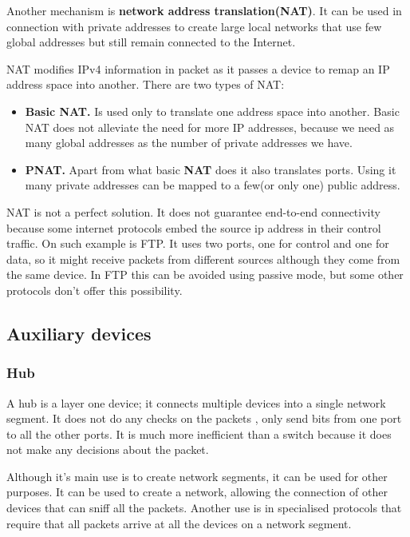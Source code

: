 Another mechanism is \textbf{network address translation(NAT)}. It can be used in connection with private addresses to create
large local networks that use few global addresses but still remain connected to the Internet. 

NAT modifies IPv4 information in packet as it passes a device to remap an IP address space into another. There are two types of
NAT:
\begin{itemize}
  \item \textbf{Basic NAT.} Is used only to translate one address space into another. Basic NAT does not alleviate the need
for more IP addresses, because we need as many global addresses as the number of private addresses we have.
  \item \textbf{PNAT.} Apart from what basic \textbf{NAT} does it also translates ports. Using it many private addresses can be mapped
to a few(or only one) public address.
\end{itemize}


NAT is not a perfect solution. It does not guarantee end-to-end connectivity because some internet protocols embed the source
ip address in their control traffic. On such example is FTP. It uses two ports, one for control and one for data, so it might receive
packets from different sources although they come from the same device. In FTP this can be avoided using passive mode, but some other protocols
don't offer this possibility.

\subsection{Auxiliary devices}
\label{sub-sec:auxdev}

\subsubsection{Hub}

A hub is a layer one device; it connects multiple devices into a single network segment. It does not do any checks on the packets
, only send bits from one port to all the other ports.  It is much more inefficient than a switch because it does not make any decisions
about the packet.

Although it's main use is to create network segments, it can be used for other purposes. It can be used to create a network, allowing
the connection of other devices that can sniff all the packets. Another use is in specialised protocols that require that all packets 
arrive at all the devices on a network segment.

